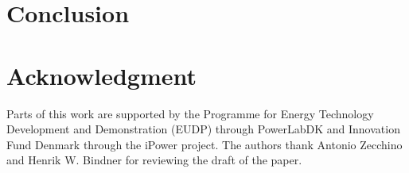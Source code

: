 \section{Conclusion}\label{sec:SEGANconclusion}


\section*{Acknowledgment}
Parts of this work are supported by the Programme for Energy Technology Development and Demonstration (EUDP) through PowerLabDK and Innovation Fund Denmark through the iPower project. The authors thank Antonio Zecchino and Henrik W. Bindner for reviewing the draft of the paper.


